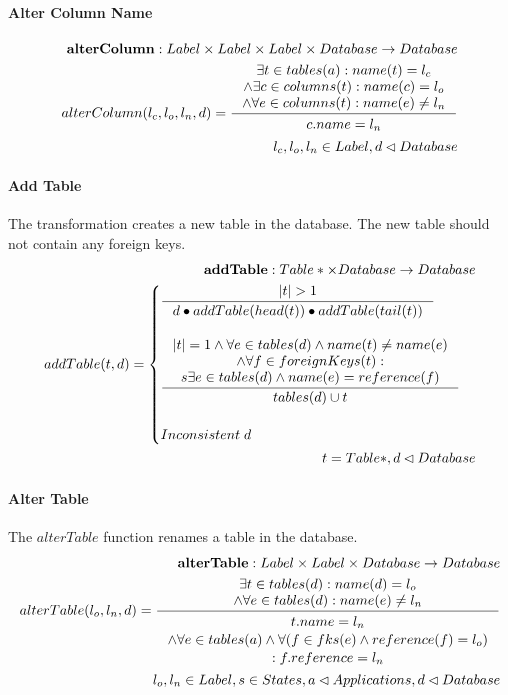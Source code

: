 \documentclass[11pt]{article}
\begin{document}
\paragraph{Alter Column Name}
\begin{align*}
\mathbf{alterColumn} : Label \times Label \times Label \times Database \rightarrow Database \\
	alterColumn(l_c, l_o, l_n, d) =
 \inference{\exists t \in tables(a) : name(t) = l_c \\ \wedge \exists c \in columns(t) : name(c) = l_o \\ \wedge \forall e \in columns(t) : name(e) \neq l_n}{\begin{gathered}
c.name = l_n 
\end{gathered}}
 \\
l_c, l_o, l_n \in Label, d \lhd Database
\end{align*}

\paragraph{Add Table} The transformation creates a new table in the database. The new table should not contain any foreign keys.
\begin{align*}
	\mathbf{addTable} : Table* \times Database \rightarrow Database \\ 
	addTable(t, d) = \begin{cases}
		\inference{|t| > 1}{d \bullet addTable(head(t)) \bullet addTable(tail(t))}
\\ \\	
		\inference{|t| = 1 \wedge \forall e \in tables(d) \wedge name(t) \neq name(e) \\ \wedge \forall f \in foreignKeys(t) : \\ s\exists e \in tables(d) \wedge name(e) = reference(f) }{tables(d) \cup t}
\\ \\
		Inconsistent \;d 
	 \end{cases}\\ 
	t = Table*, d \lhd Database
\end{align*}

\paragraph{Alter Table} The $alterTable$ function renames a table in  the database.
\begin{align*}
	\mathbf{alterTable} : Label \times Label \times Database \rightarrow Database \\
	alterTable(l_o, l_n, d) = \inference{\exists t \in tables(d) : name(d) = l_o \\ \wedge \forall e \in tables(d) : name(e) \neq l_n}{\begin{gathered}
		t.name = l_n \\ \wedge \forall e \in tables(a) \wedge \forall (f \in fks(e) \wedge reference(f) = l_o ) \\ : f.reference = l_n 
	\end{gathered}}\\
	l_o, l_n \in Label, s \in States, a \lhd Applications, d \lhd Database
\end{align*}
\end{document}
